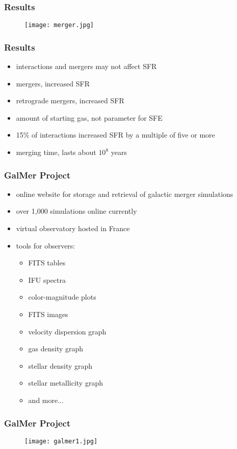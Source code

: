 \documentclass{beamer}
\begin{document}
\begin{frame}
  \frametitle{Results}
  \begin{figure}
    \texttt{[image: merger.jpg]}
  \end{figure}
\end{frame}

\begin{frame}
  \frametitle{Results}
  \begin{itemize}
    \item interactions and mergers may not affect SFR
    \item mergers, increased SFR
    \item retrograde mergers, increased SFR
    \item amount of starting gas, not parameter for SFE
    \item 15\% of interactions increased SFR by a multiple of five or more
    \item merging time, lasts about $10^8$ years
  \end{itemize}
\end{frame}

\begin{frame}
  \frametitle{GalMer Project}
  \begin{itemize}
    \item online website for storage and retrieval of galactic merger simulations
    \item over 1,000 simulations online currently
    \item virtual observatory hosted in France
    \item tools for observers:
    \begin{itemize}
      \item FITS tables
      \item IFU spectra
      \item color-magnitude plots
      \item FITS images
      \item velocity dispersion graph
      \item gas density graph
      \item stellar density graph
      \item stellar metallicity graph
      \item and more...
    \end{itemize}
  \end{itemize}
\end{frame}

\begin{frame}
  \frametitle{GalMer Project}
  \begin{figure}
    \texttt{[image: galmer1.jpg]}
  \end{figure}
\end{frame}
\end{document}
